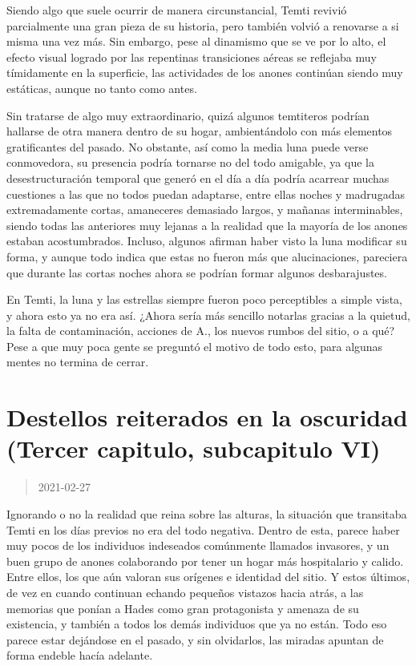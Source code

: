 \documentclass[
  spanish,
]{book}
\begin{document}
Siendo algo que suele ocurrir de manera circunstancial, Temti revivió parcialmente una gran pieza de su historia, pero también volvió a renovarse a si misma una vez más. Sin embargo, pese al dinamismo que se ve por lo alto, el efecto visual logrado por las repentinas transiciones aéreas se reflejaba muy tímidamente en la superficie, las actividades de los anones continúan siendo muy estáticas, aunque no tanto como antes.

Sin tratarse de algo muy extraordinario, quizá algunos temtiteros podrían hallarse de otra manera dentro de su hogar, ambientándolo con más elementos gratificantes del pasado. No obstante, así como la media luna puede verse conmovedora, su presencia podría tornarse no del todo amigable, ya que la desestructuración temporal que generó en el día a día podría acarrear muchas cuestiones a las que no todos puedan adaptarse, entre ellas noches y madrugadas extremadamente cortas, amaneceres demasiado largos, y mañanas interminables, siendo todas las anteriores muy lejanas a la realidad que la mayoría de los anones estaban acostumbrados. Incluso, algunos afirman haber visto la luna modificar su forma, y aunque todo indica que estas no fueron más que alucinaciones, pareciera que durante las cortas noches ahora se podrían formar algunos desbarajustes.

En Temti, la luna y las estrellas siempre fueron poco perceptibles a simple vista, y ahora esto ya no era así. ¿Ahora sería más sencillo notarlas gracias a la quietud, la falta de contaminación, acciones de A., los nuevos rumbos del sitio, o a qué? Pese a que muy poca gente se preguntó el motivo de todo esto, para algunas mentes no termina de cerrar.

\hypertarget{destellos-reiterados-en-la-oscuridad-tercer-capitulo-subcapitulo-vi}{%
\section{Destellos reiterados en la oscuridad (Tercer capitulo, subcapitulo VI)}\label{destellos-reiterados-en-la-oscuridad-tercer-capitulo-subcapitulo-vi}}

\begin{quote}
2021-02-27
\end{quote}

Ignorando o no la realidad que reina sobre las alturas, la situación que transitaba Temti en los días previos no era del todo negativa. Dentro de esta, parece haber muy pocos de los individuos indeseados comúnmente llamados invasores, y un buen grupo de anones colaborando por tener un hogar más hospitalario y calido. Entre ellos, los que aún valoran sus orígenes e identidad del sitio. Y estos últimos, de vez en cuando continuan echando pequeños vistazos hacia atrás, a las memorias que ponían a Hades como gran protagonista y amenaza de su existencia, y también a todos los demás individuos que ya no están. Todo eso parece estar dejándose en el pasado, y sin olvidarlos, las miradas apuntan de forma endeble hacía adelante.
\end{document}
